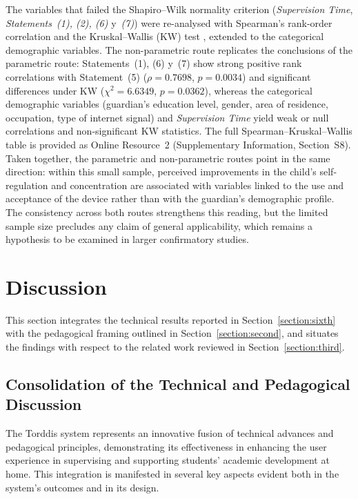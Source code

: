 The variables that failed the Shapiro--Wilk normality criterion (\textit{Supervision Time}, \textit{Statements~(1), (2), (6)} y~\textit{(7)}) were re-analysed with Spearman's rank-order correlation \citep{Yu2024Robust} and the Kruskal--Wallis (KW) test \citep{Jamil2024Influence,Smeeton2025Applied}, extended to the categorical demographic variables. The non-parametric route replicates the conclusions of the parametric route: Statements~(1), (6) y~(7) show strong positive rank correlations with Statement~(5) ($\rho=0.7698$, $p=0.0034$) and significant differences under KW ($\chi^{2}=6.6349$, $p=0.0362$), whereas the categorical demographic variables (guardian's education level, gender, area of residence, occupation, type of internet signal) and \textit{Supervision Time} yield weak or null correlations and non-significant KW statistics. The full Spearman--Kruskal--Wallis table is provided as Online Resource~2 (Supplementary Information, Section~S8). Taken together, the parametric and non-parametric routes point in the same direction: within this small sample, perceived improvements in the child's self-regulation and concentration are associated with variables linked to the use and acceptance of the device rather than with the guardian's demographic profile. The consistency across both routes strengthens this reading, but the limited sample size precludes any claim of general applicability, which remains a hypothesis to be examined in larger confirmatory studies.

\section{Discussion}
\label{section:discussion}
This section integrates the technical results reported in Section~\ref{section:sixth} with the pedagogical framing outlined in Section~\ref{section:second}, and situates the findings with respect to the related work reviewed in Section~\ref{section:third}.

\subsection{Consolidation of the Technical and Pedagogical Discussion}
The Torddis system represents an innovative fusion of technical advances and pedagogical principles, demonstrating its effectiveness in enhancing the user experience in supervising and supporting students’ academic development at home. This integration is manifested in several key aspects evident both in the system's outcomes and in its design.

